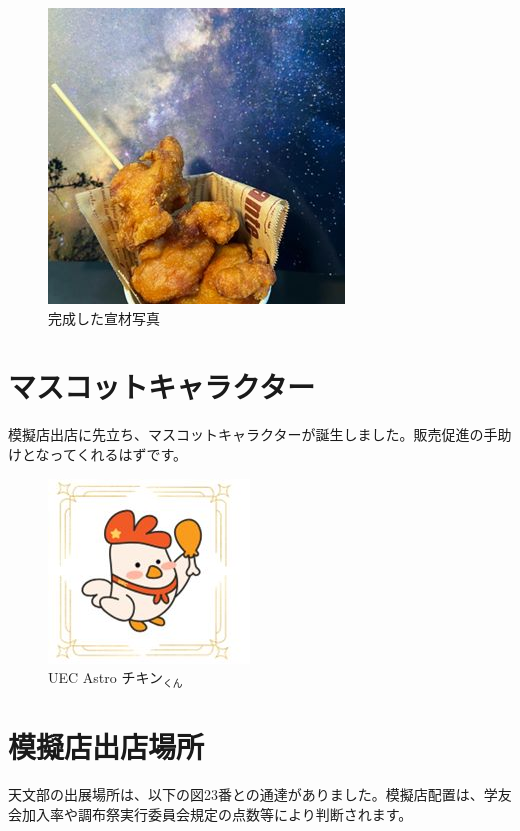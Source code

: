\documentclass[../super_nova_20yy]{subfiles}
\begin{document}
\begin{figure}[H]
\begin{minipage}[t]{0.4\columnwidth}
    \includegraphics[width=\columnwidth]{画像3.jpg}
    \caption{完成した宣材写真}
    \label{fig:3}
  \end{minipage}
\end{figure}
\section{マスコットキャラクター}
模擬店出店に先立ち、マスコットキャラクターが誕生しました。販売促進の手助けとなってくれるはずです。

\begin{figure}[H]
  \centering
  \includegraphics[width=.5\columnwidth]{画像4.jpg}
  \caption{UEC Astro チキン$_\text{くん}$}
  \label{fig:4}
\end{figure}
\section{模擬店出店場所}
天文部の出展場所は、以下の図23番との通達がありました。模擬店配置は、学友会加入率や調布祭実行委員会規定の点数等により判断されます。
\end{document}
